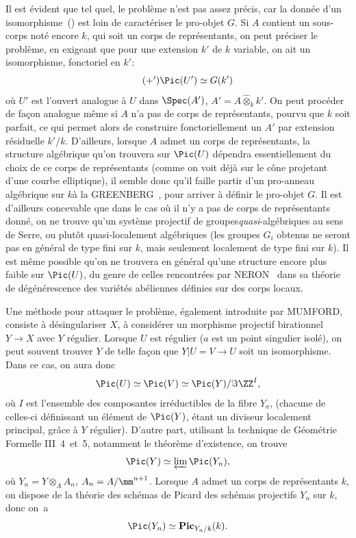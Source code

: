 Il est \'evident que tel quel, le probl\`eme n'est pas assez pr\'ecis, car la donn\'ee d'un isomorphisme~() est loin de caract\'eriser le pro-objet $G$. Si $A$ contient un sous-corps not\'e encore $k$, qui soit un corps de repr\'esentants, on peut pr\'eciser le probl\`eme, en exigeant que pour une extension $k'$ de $k$ variable, on ait un isomorphisme, fonctoriel en $k'$: \begin{equation*} \label{eq:XIII.5.+'} \tag{$+'$} {\Pic(U')\simeq G(k')} \end{equation*} o\`u $U'$ est l'ouvert analogue \`a $U$ dans $\Spec(A')$, $A'=A\hat{\otimes}_k k'$. On peut proc\'eder de fa\c con analogue m\^eme si $A$ n'a pas de corps de repr\'esentants, pourvu que $k$ soit parfait, ce qui permet alors de construire fonctoriellement un $A'$ \og par extension r\'esiduelle $k'/k$\fg. D'ailleurs, lorsque $A$ admet un corps de repr\'esentants, la structure alg\'ebrique qu'on trouvera sur $\Pic(U)$ d\'ependra essentiellement du choix de ce corps de repr\'esentants (comme on voit d\'ej\`a sur le c\^{o}ne projetant d'une courbe elliptique), il semble donc qu'il faille partir d'un \og pro-anneau alg\'ebrique sur $k$\fg \`a la GREENBERG~\cite{XIII.3}, pour arriver \`a d\'efinir le pro-objet $G$. Il est d'ailleurs concevable que dans le cas o\`u il n'y a pas de corps de repr\'esentants donn\'e, on ne trouve qu'un syst\`eme projectif de groupes\pageoriginaled \emph{quasi}-alg\'ebriques au sens de Serre, ou plut\^{o}t quasi-localement alg\'ebriques (les groupes $G_i$ obtenus ne seront pas en g\'en\'eral de type fini sur $k$, mais seulement localement de type fini sur $k$). Il est m\^eme possible qu'on ne trouvera en g\'en\'eral qu'une structure encore plus faible sur $\Pic(U)$, du genre de celles rencontr\'ees par NERON~\cite{XIII.6} dans sa th\'eorie de d\'eg\'en\'erescence des vari\'et\'es ab\'eliennes d\'efinies sur des corps locaux.

Une m\'ethode pour attaquer le probl\`eme, \'egalement introduite par MUMFORD, consiste \`a d\'esingulariser $X$, \ie \`a consid\'erer un morphisme projectif birationnel $Y\to X$ avec $Y$ r\'egulier. Lorsque $U$ est r\'egulier (\ie $a$ est un point singulier isol\'e), on peut souvent trouver $Y$ de telle fa\c con que $Y|U=V\to U$ soit un isomorphisme. Dans ce cas, on aura donc $$ \Pic(U)\simeq\Pic(V)\simeq\Pic(Y)/\Im \ZZ^I, $$ o\`u $I$ est l'ensemble des composantes irr\'eductibles de la fibre $Y_{a}$,  (chacune de celles-ci d\'efinissant un \'el\'ement de $\Pic(Y)$, \'etant un diviseur localement principal, gr\^ace \`a $Y$ r\'egulier). D'autre part, utilisant la technique de G\'eom\'etrie Formelle \EGA III~4~et~5, notamment le th\'eor\`eme d'existence, on trouve $$ \Pic(Y)\simeq\varprojlim\Pic(Y_n), $$ o\`u $Y_n=Y\otimes_A A_n$, $A_n=A/\mm^{n+1}$. Lorsque $A$ admet un corps de repr\'esentants $k$, on dispose de la th\'eorie des sch\'emas de Picard des sch\'emas projectifs $Y_n$ sur $k$, donc on~a $$ \Pic(Y_n)\simeq \mathbf{Pic}_{Y_n/k}(k). $$

